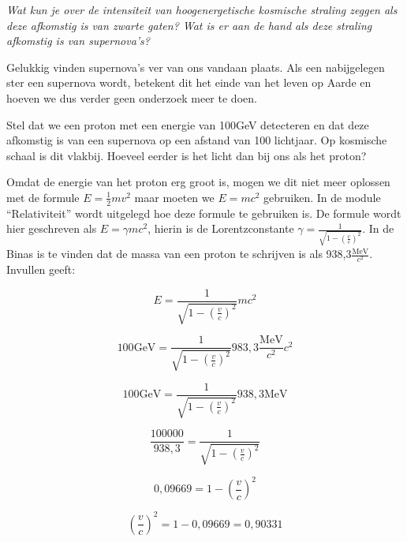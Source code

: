 \emph{Wat kun je over de intensiteit van hoogenergetische kosmische
straling zeggen als deze afkomstig is van zwarte gaten? Wat is er
aan de hand als deze straling afkomstig is van supernova's? }

Gelukkig vinden supernova's ver van ons vandaan plaats. Als een nabijgelegen
ster een supernova wordt, betekent dit het einde van het leven op
Aarde en hoeven we dus verder geen onderzoek meer te doen. 

Stel dat we een proton met een energie van 100GeV detecteren en dat
deze afkomstig is van een supernova op een afstand van 100 lichtjaar.
Op kosmische schaal is dit vlakbij. Hoeveel eerder is het licht dan
bij ons als het proton?

Omdat de energie van het proton erg groot is, mogen we dit niet meer
oplossen met de formule $E=\frac{1}{2}mv^{2}$ maar moeten we $E=mc^{2}$
gebruiken. In de module ``Relativiteit'' wordt uitgelegd hoe deze
formule te gebruiken is. De formule wordt hier geschreven als $E=\gamma mc^{2}$,
hierin is de Lorentzconstante $\gamma=\frac{1}{\sqrt{1-\left(\frac{v}{c}\right)^{2}}}$.
In de Binas is te vinden dat de massa van een proton te schrijven
is als 938,3$\frac{\mathrm{MeV}}{c^{2}}$. Invullen geeft:

\begin{equation}
E=\frac{1}{\sqrt{1-\left(\frac{v}{c}\right)^{2}}}mc^{2}
\end{equation}


\begin{equation}
100\mathrm{GeV}=\frac{1}{\sqrt{1-\left(\frac{v}{c}\right)^{2}}}983,3\frac{\mathrm{MeV}}{c^{2}}c^{2}
\end{equation}


\begin{equation}
100\mathrm{GeV}=\frac{1}{\sqrt{1-\left(\frac{v}{c}\right)^{2}}}938,3\mathrm{MeV}
\end{equation}


\begin{equation}
\frac{100000}{938,3}=\frac{1}{\sqrt{1-\left(\frac{v}{c}\right)^{2}}}
\end{equation}


\begin{equation}
0,09669=1-\left(\frac{v}{c}\right)^{2}
\end{equation}


\begin{equation}
\left(\frac{v}{c}\right)^{2}=1-0,09669=0,90331
\end{equation}


